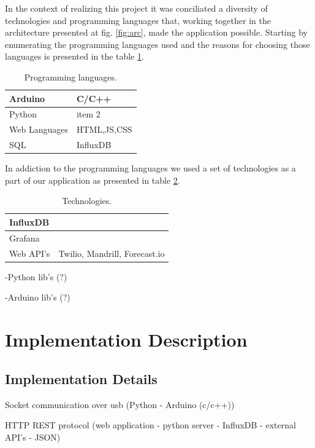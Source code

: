 \documentclass[12pt]{report}
\begin{document}
In the context of realizing this project it was conciliated a diversity of technologies and programming languages that, working together in the architecture presented at fig. \ref{fig:arc}, made the application possible. Starting by enumerating the programming languages used and the reasons for choosing those languages is presented in the table \ref{tab:prolangs}.


\begin{table}[H]
\begin{tabularx}{0.8\textwidth}{ |l|X| }
  	\hline
  	Arduino  & C/C++  \\
 	\hline
 	Python  & item 2   \\
  	\hline
 	Web Languages  & HTML,JS,CSS   \\
	\hline
	SQL  & InfluxDB   \\
	\hline
\end{tabularx}
	\caption{Programming languages.}
  	\label{tab:prolangs}
\end{table}

In addiction to the programming languages we used a set of technologies as a part of our application as presented in table \ref{tab:tech}.

\begin{table}[H]
\begin{tabularx}{0.8\textwidth}{ |l|X| }
  	\hline
  	InfluxDB  &   \\
 	\hline
 	Grafana  &   \\
  	\hline
 	Web API's & Twilio, Mandrill, Forecast.io   \\
	\hline
\end{tabularx}
	\caption{Technologies.}
  	\label{tab:tech}
\end{table}

-Python lib's (?)

-Arduino lib's (?)

\section{Implementation Description}

\subsection{Implementation Details}

Socket communication over usb (Python - Arduino (c/c++))

HTTP REST protocol  (web application - python server - InfluxDB - external API's - JSON)
\end{document}
